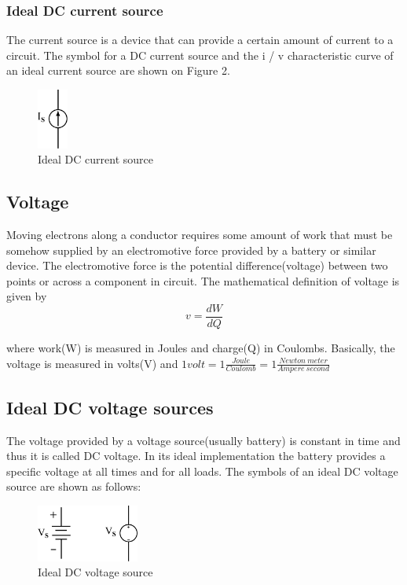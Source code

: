 \documentclass[a4 paper]{article}
\numberwithin{equation}{section}
\newcommand{\0}{\mathbf{0}}
\begin{document}
\subsubsection{Ideal DC current source}
The current source is a device that can provide a certain amount of current to a circuit. The symbol for a DC current source and the i / v characteristic curve of an ideal current source are shown on Figure 2.
\begin{figure}[!ht]
  \caption{Ideal DC current source}
  \centering
  \includegraphics[width=0.09\textwidth]{./images/circuit1/current1}
\end{figure}




\subsection{Voltage}
Moving electrons along a conductor requires some amount of work that must be somehow supplied by an electromotive force provided by a battery or similar device. The electromotive force is the potential difference(voltage) between two points or across a component in circuit. The mathematical definition of voltage is given by
\begin{equation}
v = \frac{dW}{dQ} 
\end{equation}

where work(W) is measured in Joules and charge(Q) in Coulombs.
Basically, the voltage is measured in volts(V) and $1 volt = 1 \frac{Joule}{Coulomb} = 1 \frac{Newton \ meter}{Ampere \ second}$

\subsection{Ideal DC voltage sources}
The voltage provided by a voltage source(usually battery) is constant in time and thus it is called DC voltage. In its ideal implementation the battery provides a specific voltage at all times and for all loads.
The symbols of an ideal DC voltage source are shown as follows:

\begin{figure}[!ht]
  \caption{Ideal DC voltage source}
  \centering
  \includegraphics[width=0.3\textwidth]{./images/circuit1/VoltageSource}
\end{figure}
\end{document}

